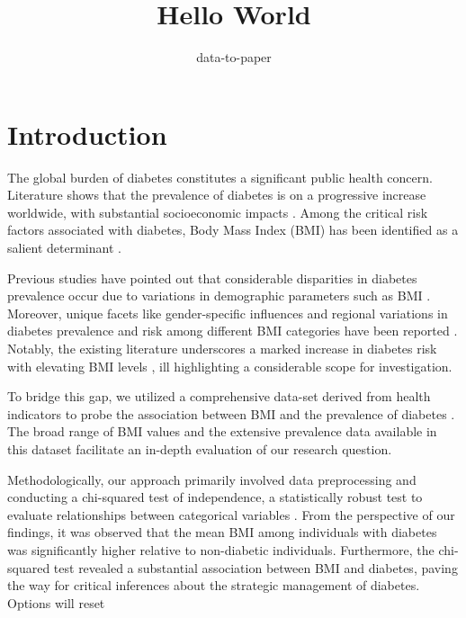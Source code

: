 \documentclass[12pt]{article}
\title{Hello World}
\author{data-to-paper}
\begin{document}
\maketitle

\section{Introduction}

The global burden of diabetes constitutes a significant public health concern. Literature shows that the prevalence of diabetes is on a progressive increase worldwide, with substantial socioeconomic impacts \cite{Uloko2018PrevalenceAR, Mokdad2001TheCE}. Among the critical risk factors associated with diabetes, Body Mass Index (BMI) has been identified as a salient determinant \cite{Zhu2019RacialEthnicDI, rnlv2010ImpactOB}. 

Previous studies have pointed out that considerable disparities in diabetes prevalence occur due to variations in demographic parameters such as BMI \cite{rnlv2010ImpactOB}. Moreover, unique facets like gender-specific influences and regional variations in diabetes prevalence and risk among different BMI categories have been reported \cite{Read2021BMIAR, Rho2014IndependentIO}. Notably, the existing literature underscores a marked increase in diabetes risk with elevating BMI levels \cite{Logue2013AssociationBB}, ill highlighting a considerable scope for investigation.

To bridge this gap, we utilized a comprehensive data-set derived from health indicators to probe the association between BMI and the prevalence of diabetes \cite{Deberneh2021PredictionOT}. The broad range of BMI values and the extensive prevalence data available in this dataset facilitate an in-depth evaluation of our research question.

Methodologically, our approach primarily involved data preprocessing and conducting a chi-squared test of independence, a statistically robust test to evaluate relationships between categorical variables \cite{Mongraw-Chaffin2015TheSA}. From the perspective of our findings, it was observed that the mean BMI among individuals with diabetes was significantly higher relative to non-diabetic individuals. Furthermore, the chi-squared test revealed a substantial association between BMI and diabetes, paving the way for critical inferences about the strategic management of diabetes.
Options will reset
\end{document}
